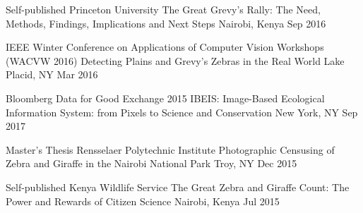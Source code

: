 \begin{cventries}
  \cventryshort
    {Self-published \dotSep Princeton University} %
    {The Great Grevy’s Rally: The Need, Methods, Findings, Implications and Next Steps} %
    {Nairobi, Kenya} %
    {Sep 2016} %

  \cventryshort
    {IEEE Winter Conference on Applications of Computer Vision Workshops (WACVW 2016)} %
    {Detecting Plains and Grevy's Zebras in the Real World} %
    {Lake Placid, NY} %
    {Mar 2016} %

  \cventryshort
    {Bloomberg Data for Good Exchange 2015} %
    {IBEIS: Image-Based Ecological Information System: from Pixels to Science and Conservation} %
    {New York, NY} %
    {Sep 2017} %

  \cventryshort
    {Master's Thesis \dotSep Rensselaer Polytechnic Institute} %
    {Photographic Censusing of Zebra and Giraffe in the Nairobi National Park} %
    {Troy, NY} %
    {Dec 2015} %

  \cventryshort
    {Self-published \dotSep Kenya Wildlife Service} %
    {The Great Zebra and Giraffe Count: The Power and Rewards of Citizen Science} %
    {Nairobi, Kenya} %
    {Jul 2015} %



\end{cventries}
